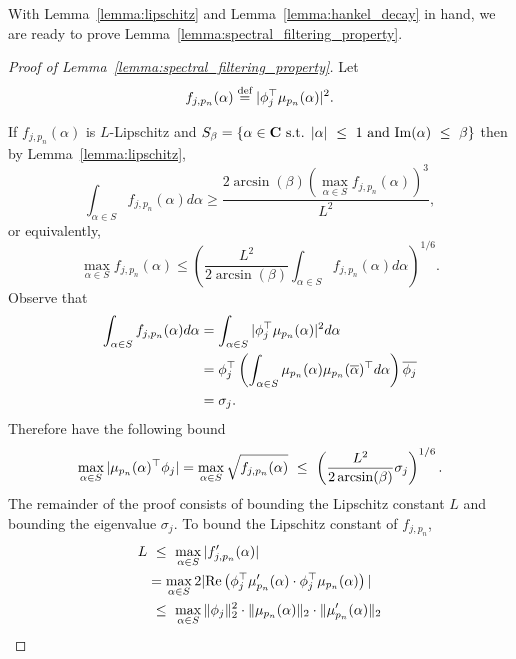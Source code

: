 With Lemma~\ref{lemma:lipschitz} and Lemma~\ref{lemma:hankel_decay} in hand, we are ready to prove Lemma~\ref{lemma:spectral_filtering_property}. 
\begin{proof}[Proof of Lemma~\ref{lemma:spectral_filtering_property}]
Let
\begin{equation*}
    f_{j, p_n}(\alpha) \stackrel{\text{def}}{=} |\phi_j^{\top} \mu_{p_n}(\alpha)|^2.
\end{equation*}

If $f_{j, p_n}(\alpha)$ is $L$-Lipschitz and $S_{\beta}= \left \{ \alpha \in \mathbf{C} \textrm{ s.t. } |\alpha| ~\le~ 1 \textrm{ and } \mathrm{Im}(\alpha) ~\le~ \beta \right \}$ then by Lemma~\ref{lemma:lipschitz},
\begin{equation*}
    \int_{\alpha \in S} f_{j, p_n} (\alpha) d\alpha \geq \frac{2 \arcsin(\beta) \left( \max_{\alpha \in S} f_{j, p_n}(\alpha) \right)^3  }{L^2},
\end{equation*}
or equivalently,
\begin{equation*}
   \max_{\alpha \in S} f_{j, p_n}(\alpha)  \leq \left( \frac{L^2}{2 \arcsin(\beta)}  \int_{\alpha \in S} f_{j, p_n}(\alpha) d\alpha \right)^{1/6}.
\end{equation*}
Observe that
\begin{align*}
\int_{\alpha \in S} f_{j, p_n}(\alpha) d\alpha & = \int_{\alpha \in S}  |\phi_j^{\top} \mu_{p_n}(\alpha)|^2 d \alpha \\
& = \phi_j^{\top} \left( \int_{\alpha \in S}   \mu_{p_n}(\alpha) \mu_{p_n}(\overline{\alpha})^{\top} d \alpha   \right) \overline{\phi_j}  \\
& = \sigma_j.
\end{align*}
Therefore have the following bound
\begin{equation}
\label{eqn:bound1}
    \max_{\alpha \in S} |\mu_{p_n}(\alpha)^{\top} \phi_j| = \max_{\alpha \in S} \sqrt{f_{j, p_n}(\alpha)}  ~\le~ \left( \frac{L^2}{2 \arcsin(\beta)} \sigma_j \right)^{1/6}.
\end{equation}
The remainder of the proof consists of bounding the Lipschitz constant $L$ and bounding the eigenvalue $\sigma_j$.
To bound the Lipschitz constant of $f_{j,p_n}$,
\begin{align*}
  L & \leq \max_{\alpha \in S} \abs{ f'_{j, p_n}(\alpha) } \\
  & =  \max_{\alpha \in S} 2 \abs{ \mathrm{Re} \left( \phi_j^{\top} \mu_{p_n}'(\alpha) \cdot \phi_j^{\top} \mu_{p_n}(\alpha) \right)} \\
    & \leq \max_{\alpha \in S} \norm{\phi_j}_2^2 \cdot \norm{\mu_{p_n}(\alpha)}_2 \cdot \norm{\mu'_{p_n}(\alpha)}_2 \\

\end{align*}
\end{proof}
